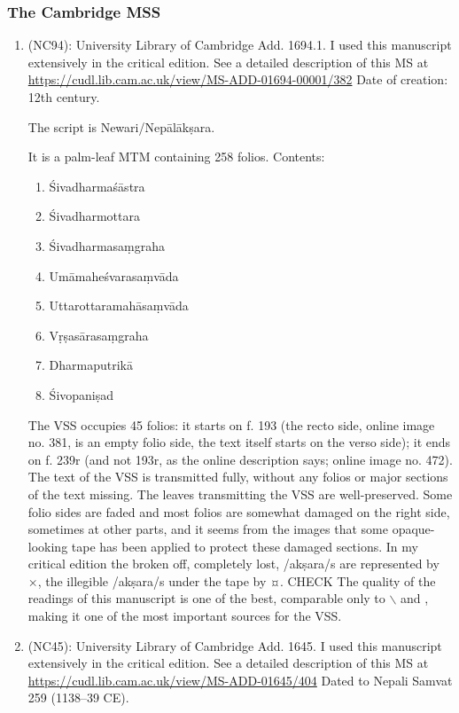 \documentclass[11pt]{article}
\begin{document}
\subsubsection{The Cambridge MSS}
\label{sec:org333b616}
\begin{enumerate}
\item \msCa (NC94): University Library of Cambridge Add. 1694.1.
\label{sec:orgaf70b57}
I used this manuscript extensively in the critical edition. 
See a detailed description of this MS at
	\url{https://cudl.lib.cam.ac.uk/view/MS-ADD-01694-00001/382}
Date of creation: 12th century.

The script is Newari/Nepālākṣara.

It is a palm-leaf MTM containing 258 folios.
Contents:
\begin{enumerate}
\item Śivadharmaśāstra
\item Śivadharmottara
\item Śivadharmasaṃgraha
\item Umāmaheśvarasaṃvāda
\item Uttarottaramahāsaṃvāda
\item Vṛṣasārasaṃgraha
\item Dharmaputrikā
\item Śivopaniṣad
\end{enumerate}
The VSS occupies 45 folios: 
	it starts on f. 193 (the recto side, online image no. 381,      
	is an empty folio side, the text itself starts on the verso side);
	it ends on f. 239r (and not 193r, as the online description says; online image no. 472).
	The text of the VSS is transmitted fully, without any folios or major sections of the text missing.
The leaves transmitting the VSS are well-preserved. Some folio
      sides are faded and most folios are somewhat damaged on the right side, 
      sometimes at other parts, and it seems from the images that some opaque-looking tape has been
      applied to protect these damaged sections. In my critical edition the broken off, completely lost,
      /akṣara/s are represented by ×, the illegible /akṣara/s under the tape by ¤. CHECK
The quality of the readings of this manuscript is one of the best,
comparable only to \msNa$\backslash$ and \msP, making it one of the most
important sources for the VSS.

\item \msCb (NC45): University Library of Cambridge Add. 1645.
\label{sec:org9de9905}
I used this manuscript extensively in the critical edition. 
See a detailed description of this MS at
      \url{https://cudl.lib.cam.ac.uk/view/MS-ADD-01645/404} 
Dated to Nepali Samvat 259 (1138--39 CE).


\end{enumerate}
\end{document}
